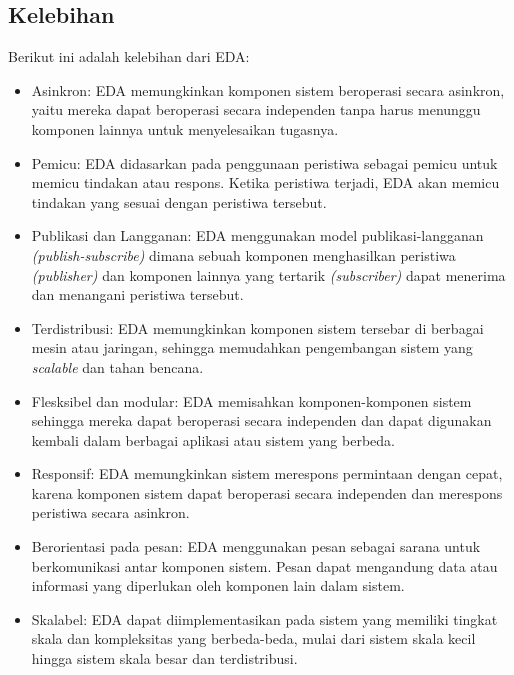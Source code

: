 \subsection{Kelebihan}
Berikut ini adalah kelebihan dari EDA:
\begin{itemize}
\item Asinkron: EDA memungkinkan komponen sistem beroperasi secara asinkron, yaitu mereka dapat beroperasi secara independen tanpa harus menunggu komponen lainnya untuk menyelesaikan tugasnya.	
\item Pemicu: EDA didasarkan pada penggunaan peristiwa sebagai pemicu untuk memicu tindakan atau respons. Ketika peristiwa terjadi, EDA akan memicu tindakan yang sesuai dengan peristiwa tersebut.	
\item Publikasi dan Langganan: EDA menggunakan model publikasi-langganan \textit{(publish-subscribe)} dimana sebuah komponen menghasilkan peristiwa \textit{(publisher)} dan komponen lainnya yang tertarik \textit{(subscriber)} dapat menerima dan menangani peristiwa tersebut.	
\item Terdistribusi: EDA memungkinkan komponen sistem tersebar di berbagai mesin atau jaringan, sehingga memudahkan pengembangan sistem yang \textit{scalable} dan tahan bencana.	

\item Flesksibel dan modular: EDA
memisahkan komponen-komponen sistem sehingga mereka dapat beroperasi secara independen dan dapat digunakan kembali dalam berbagai aplikasi atau sistem yang berbeda.	
\item Responsif: EDA memungkinkan sistem merespons permintaan dengan cepat, karena komponen sistem dapat beroperasi secara independen dan merespons peristiwa secara asinkron.	
\item Berorientasi pada pesan: EDA menggunakan pesan sebagai sarana untuk berkomunikasi antar komponen sistem. Pesan dapat mengandung data atau informasi yang diperlukan oleh komponen lain dalam sistem.	
\item Skalabel: EDA dapat diimplementasikan pada sistem yang memiliki tingkat skala dan kompleksitas yang berbeda-beda, mulai dari sistem skala kecil hingga sistem skala besar dan terdistribusi.
\end{itemize}

